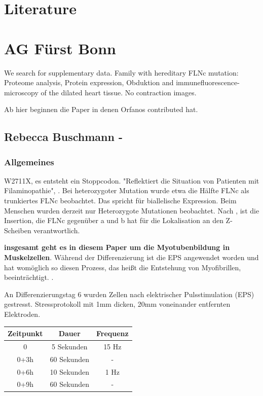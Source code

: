 
\section{Literature}


\section*{AG Fürst Bonn}
We search for supplementary data.
\cite{Holtzhausen2024} Family with hereditary FLNc mutation: Proteome analysis, Protein expression, Obduktion and immunefluorescence-microscopy of the dilated heart tissue. No contraction images.


Ab hier beginnen die Paper in denen Orfanos contributed hat.
\cite{Kley2021}

\subsection*{Rebecca Buschmann - }
\subsubsection*{Allgemeines}

W2711X, es entsteht ein Stoppcodon. "Reflektiert die Situation von Patienten mit Filaminopathie", \cite[p.14]{Unterbusch2017}. Bei heterozygoter Mutation wurde etwa die Hälfte FLNc als trunkiertes FLNc beobachtet. Das spricht für biallelische Expression. Beim Menschen wurden derzeit nur Heterozygote Mutationen beobachtet.
Nach \cite{vanderVen2000gFilamin}, ist die Insertion, die FLNc gegenüber a und b hat für die Lokalisation an den Z-Scheiben verantwortlich.

\textbf{insgesamt geht es in diesem Paper um die Myotubenbildung in Muskelzellen}. Während der Differenzierung ist die EPS angewendet worden und hat womöglich so diesen Prozess, das heißt die Entstehung von Myofibrillen, beeinträchtigt. .
\newline 


An Differenzierungstag 6 wurden Zellen nach elektrischer Pulsstimulation (EPS) gestresst.
Stressprotokoll mit 1mm dicken, 20mm voneinander entfernten Elektroden.
\begin{table}[h]
\centering
\begin{tabular}{|c|c|c|}
\hline
Zeitpunkt & Dauer & Frequenz \\
\hline
0 & 5 Sekunden& 15 Hz\\
\hline
0+3h & 60 Sekunden & - \\
\hline
0+6h & 10 Sekunden & 1 Hz \\
\hline
0+9h & 60 Sekunden & - \\
\hline
\end{tabular}


\end{table}

